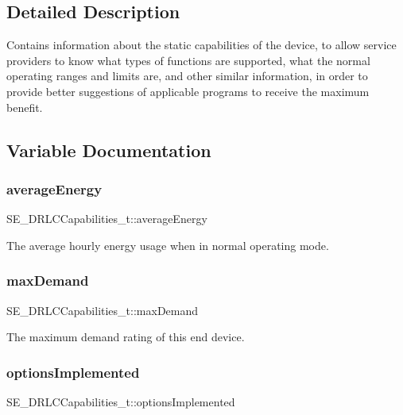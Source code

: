 \subsection{Detailed Description}
Contains information about the static capabilities of the device, to allow service providers to know what types of functions are supported, what the normal operating ranges and limits are, and other similar information, in order to provide better suggestions of applicable programs to receive the maximum benefit. 

\subsection{Variable Documentation}
\mbox{\label{group__DRLCCapabilities_ga6e021a85ef95aff057ee874c073e496e}} 
\subsubsection{\texorpdfstring{average\+Energy}{averageEnergy}}
{\footnotesize\ttfamily S\+E\+\_\+\+D\+R\+L\+C\+Capabilities\+\_\+t\+::average\+Energy}

The average hourly energy usage when in normal operating mode. \mbox{\label{group__DRLCCapabilities_ga5a0d146e5a4e0b544873034fb4d8b0a4}} 
\subsubsection{\texorpdfstring{max\+Demand}{maxDemand}}
{\footnotesize\ttfamily S\+E\+\_\+\+D\+R\+L\+C\+Capabilities\+\_\+t\+::max\+Demand}

The maximum demand rating of this end device. \mbox{\label{group__DRLCCapabilities_gaea3195869d953f2caa66af4cadd8b567}} 
\subsubsection{\texorpdfstring{options\+Implemented}{optionsImplemented}}
{\footnotesize\ttfamily S\+E\+\_\+\+D\+R\+L\+C\+Capabilities\+\_\+t\+::options\+Implemented}

